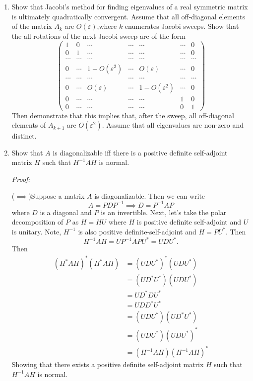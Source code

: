 \documentclass[a4paper,12pt]{article}
\newcommand{\eps}{\varepsilon}
\newcommand{\pmat}[1]{\begin{pmatrix} #1 \end{pmatrix}}
\newenvironment{proof}[2][$\square$]
    {\setlength{\parskip}{0pt}\par\textit{Proof:} #2\setlength{\parskip}{0.25cm}
        \savebox{\qed}{#1}
        \begin{adjustwidth}{\widthof{Proof:}}{}
    }
    {
        \hfill\usebox{\qed}\end{adjustwidth}
    }
\begin{document}
\begin{enumerate}[label = (\arabic*)]
	\item Show that Jacobi's method for finding eigenvalues of a real symmetric matrix is ultimately quadratically convergent. Assume that all off-diagonal elements of the matrix $ A_k $ are $ O(\eps) $,where $ k $ enumerates Jacobi sweeps. Show that the all rotations of the next Jacobi sweep are of the form
	\[
		\pmat{
			1 & 0 & \cdots & \cdots & \cdots & \cdots & 0 \\
			0 & 1 & \cdots & \cdots & \cdots & \cdots & 0 \\
			\cdots & \cdots & \cdots & \cdots & \cdots & \cdots & \cdots \\
			0 & \cdots & 1- O(\eps^2) & \cdots & O(\eps) & \cdots & 0 \\
			\cdots & \cdots & \cdots & \cdots & \cdots & \cdots & \cdots \\
			0 & \cdots & O(\eps) & \cdots & 1 - O(\eps^2) & \cdots & 0 \\
			0 & \cdots & \cdots & \cdots & \cdots & 1 & 0 \\
			0 & \cdots & \cdots & \cdots & \cdots & 0 & 1
		}
	\]
	Then demonstrate that this implies that, after the sweep, all off-diagonal elements of $ A_{k+1} $ are $ O(\eps^2) $. Assume that all eigenvalues are non-zero and distinct.
	
	\newpage
	\item Show that $ A $ is diagonalizable iff there is a positive definite self-adjoint matrix $ H $ such that $ H^{-1} A H $ is normal.
	
	\begin{proof}{}
		($ \implies $)Suppose a matrix $ A $ is diagonalizable. Then we can write
		\[
			A = P D P^{-1} \implies D = P^{-1} A P
		\]
		where $ D $ is a diagonal and $ P $ is an invertible. Next, let's take the polar decomposition of $ P $ as $ H = HU $ where $ H $ is positive definite self-adjoint and $ U $ is unitary. Note, $ H^{-1} $ is also positive definite-self-adjoint and $ H = PU^* $. Then
		\[
			H^{-1} A H = U P^{-1} A P U^* = U D U^*.
		\]
		Then
		\begin{align*}
			(H^* A H)^*(H^* A H) &= (U D U^*)^*(U D U^*) \\
			&= (U D^* U^*)(U D U^*) \\
			&= U D^* D U^* \\
			&= U D D^* U^* \\
			&= (U D U^*) (U D^* U^*) \\
			&= (U D U^*) (U D U^*)^* \\
			&= (H^{-1} A H) (H^{-1} A H)^*
		\end{align*}
		Showing that there exists a positive definite self-adjoint matrix $ H  $ such that $ H^{-1}AH $ is normal.
		

\end{proof}
\end{enumerate}
\end{document}
